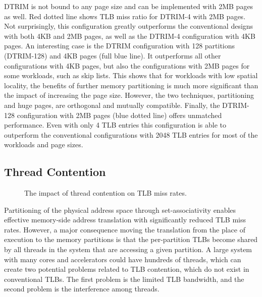 DTRIM is not bound to any page size and can be implemented with 2MB pages as well. Red dotted line shows TLB miss ratio for DTRIM-4 with 2MB pages. Not surprisingly, this configuration greatly outperforms the conventional designs with both 4KB and 2MB pages, as well as the DTRIM-4 configuration with 4KB pages. An interesting case is the DTRIM configuration with 128 partitions (DTRIM-128) and 4KB pages (full blue line). It outperforms all other configurations with 4KB pages, but also the configurations with 2MB pages for some workloads, such as skip lists. This shows that for workloads with low spatial locality, the benefits of further memory partitioning is much more significant than the impact of increasing the page size. However, the two techniques, partitioning and huge pages, are orthogonal and mutually compatible. Finally, the DTRIM-128 configuration with 2MB pages (blue dotted line) offers unmatched performance. Even with only 4 TLB entries this configuration is able to outperform the conventional configurations with 2048 TLB entries for most of the workloads and page sizes.


\subsection{Thread Contention}
\begin{figure}[t]
    \centering
    \caption{The impact of thread contention on TLB miss rates.}
    \label{fig:contention}
\end{figure}


Partitioning of the physical address space through set-associativity enables effective memory-side address translation with significantly reduced TLB miss rates.  However, a major consequence moving the translation from the place of execution to the memory partitions is that the per-partition TLBs become shared by all threads in the system that are accessing a given partition. A large system with many cores and accelerators could have hundreds of threads, which can create two potential problems related to TLB contention, which do not exist in conventional TLBs. The first problem is the limited TLB bandwidth, and the second problem is the interference among threads. 

